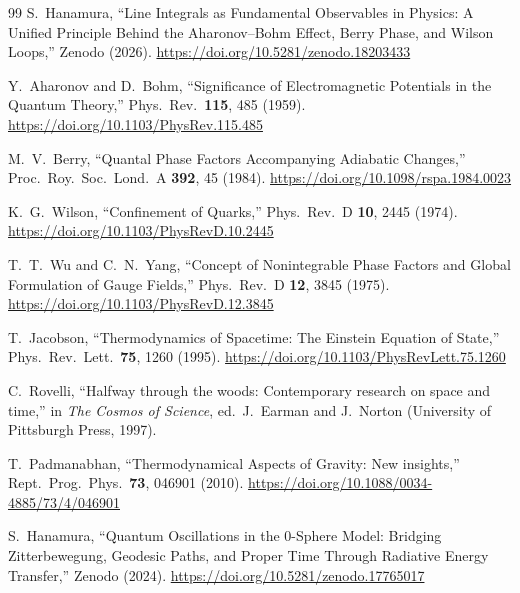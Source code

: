\documentclass[%
 reprint,
 amsmath,amssymb,
 aps,
 prb,
]{revtex4-2}
\numberwithin{equation}{section}
\begin{document}
\begin{thebibliography}{99}
S.~Hanamura, ``Line Integrals as Fundamental Observables in Physics: A Unified Principle Behind the Aharonov--Bohm Effect, Berry Phase, and Wilson Loops,'' Zenodo (2026). \href{https://doi.org/10.5281/zenodo.18203433}{https://doi.org/10.5281/zenodo.18203433}


Y.~Aharonov and D.~Bohm,
``Significance of Electromagnetic Potentials in the Quantum Theory,''
Phys.\ Rev.\ \textbf{115}, 485 (1959).
\href{https://doi.org/10.1103/PhysRev.115.485}{https://doi.org/10.1103/PhysRev.115.485}

M.~V.~Berry,
``Quantal Phase Factors Accompanying Adiabatic Changes,''
Proc.\ Roy.\ Soc.\ Lond.\ A \textbf{392}, 45 (1984).
\href{https://doi.org/10.1098/rspa.1984.0023}{https://doi.org/10.1098/rspa.1984.0023}

K.~G.~Wilson,
``Confinement of Quarks,''
Phys.\ Rev.\ D \textbf{10}, 2445 (1974).
\href{https://doi.org/10.1103/PhysRevD.10.2445}{https://doi.org/10.1103/PhysRevD.10.2445}

T.~T.~Wu and C.~N.~Yang,
``Concept of Nonintegrable Phase Factors and Global Formulation of Gauge Fields,''
Phys.\ Rev.\ D \textbf{12}, 3845 (1975).
\href{https://doi.org/10.1103/PhysRevD.12.3845}{https://doi.org/10.1103/PhysRevD.12.3845}

T.~Jacobson,
``Thermodynamics of Spacetime: The Einstein Equation of State,''
Phys.\ Rev.\ Lett.\ \textbf{75}, 1260 (1995).
\href{https://doi.org/10.1103/PhysRevLett.75.1260}{https://doi.org/10.1103/PhysRevLett.75.1260}

C.~Rovelli,
``Halfway through the woods: Contemporary research on space and time,''
in \textit{The Cosmos of Science},
ed.\ J.~Earman and J.~Norton
(University of Pittsburgh Press, 1997).

T.~Padmanabhan,
``Thermodynamical Aspects of Gravity: New insights,''
Rept.\ Prog.\ Phys.\ \textbf{73}, 046901 (2010).
\href{https://doi.org/10.1088/0034-4885/73/4/046901}{https://doi.org/10.1088/0034-4885/73/4/046901}

S.~Hanamura,
``Quantum Oscillations in the 0-Sphere Model: Bridging Zitterbewegung, Geodesic Paths, and Proper Time Through Radiative Energy Transfer,''
Zenodo (2024).
\href{https://doi.org/10.5281/zenodo.17765017}{https://doi.org/10.5281/zenodo.17765017}

\end{thebibliography}

\end{document}

